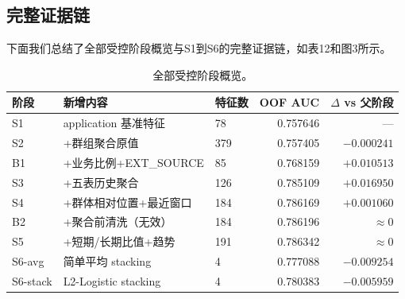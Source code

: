 \documentclass[12pt,UTF8,fontset=windows]{ctexart}
\begin{document}
\subsection{完整证据链}
下面我们总结了全部受控阶段概览与S1到S6的完整证据链，如表12和图3所示。
\begin{table}[h]
\centering\small
\caption{全部受控阶段概览。}\label{tab:full-chain}
\begin{tabular}{lllrr}
\toprule
阶段 & 新增内容 & 特征数 & OOF AUC & $\Delta$ vs 父阶段 \\
\midrule
S1   & application 基准特征 & 78   & 0.757646 & --- \\
S2   & +群组聚合原值 & 379  & 0.757405 & $-0.000241$ \\
B1   & +业务比例+EXT\_SOURCE & 85 & 0.768159 & $+0.010513$ \\
S3   & +五表历史聚合 & 126  & 0.785109 & $+0.016950$ \\
S4   & +群体相对位置+最近窗口 & 184 & 0.786169 & $+0.001060$ \\
B2   & +聚合前清洗（无效）& 184 & 0.786196 & $\approx 0$ \\
S5   & +短期/长期比值+趋势 & 191 & 0.786342 & $\approx 0$ \\
S6-avg   & 简单平均 stacking & 4 & 0.777088 & $-0.009254$ \\
S6-stack & L2-Logistic stacking & 4 & 0.780383 & $-0.005959$ \\
\bottomrule
\end{tabular}
\end{table}
\end{document}
